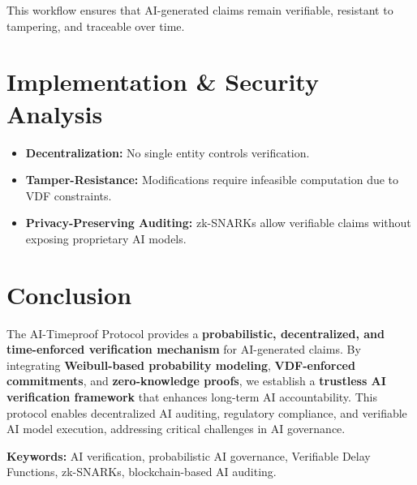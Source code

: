 \documentclass[12pt]{report}
\begin{document}
This workflow ensures that AI-generated claims remain verifiable, resistant to tampering, and traceable over time.

\section{Implementation \& Security Analysis}

\begin{itemize}
    \item \textbf{Decentralization:} No single entity controls verification.
    \item \textbf{Tamper-Resistance:} Modifications require infeasible computation due to VDF constraints.
    \item \textbf{Privacy-Preserving Auditing:} zk-SNARKs allow verifiable claims without exposing proprietary AI models.
\end{itemize}

\section{Conclusion}

The AI-Timeproof Protocol provides a \textbf{probabilistic, decentralized, and time-enforced verification mechanism} for AI-generated claims. By integrating \textbf{Weibull-based probability modeling}, \textbf{VDF-enforced commitments}, and \textbf{zero-knowledge proofs}, we establish a \textbf{trustless AI verification framework} that enhances long-term AI accountability. This protocol enables decentralized AI auditing, regulatory compliance, and verifiable AI model execution, addressing critical challenges in AI governance.

\bigskip
\noindent\textbf{Keywords:} AI verification, probabilistic AI governance, Verifiable Delay Functions, zk-SNARKs, blockchain-based AI auditing.
\end{document}
